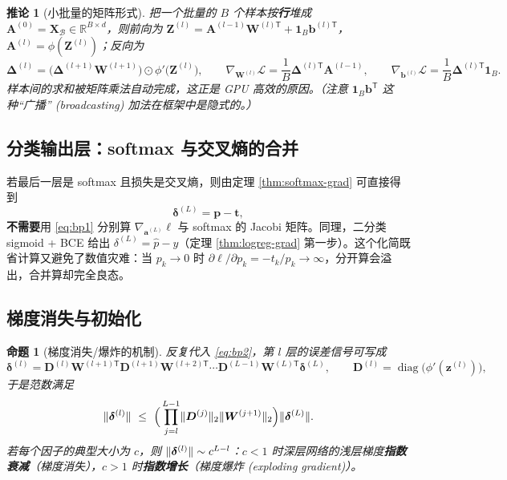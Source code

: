 \documentclass[UTF8,a4paper,11pt]{ctexart}
\theoremstyle{definition}
\theoremstyle{plain}
\newtheorem{proposition}[definition]{命题}
\newtheorem{corollary}[definition]{推论}
\theoremstyle{remark}
\DeclarePairedDelimiter{\norm}{\lVert}{\rVert}
\DeclareMathOperator{\diag}{diag}
\newcommand{\R}{\mathbb{R}}
\newcommand{\Loss}{\mathcal{L}}
\newcommand{\T}{^{\mathsf{T}}}
\newcommand{\eng}[1]{\textup{(#1)}}
\begin{document}
\begin{corollary}[小批量的矩阵形式]\label{cor:bp-batch}
把一个批量的 $B$ 个样本按\textbf{行}堆成 $\bm{A}^{(0)}=\bm{X}_{\mathcal{B}}\in\R^{B\times d}$，则前向为
$\bm{Z}^{(l)}=\bm{A}^{(l-1)}\bm{W}^{(l)\mathsf{T}}+\bm{1}_B\bm{b}^{(l)\mathsf{T}}$，$\bm{A}^{(l)}=\phi(\bm{Z}^{(l)})$；反向为
\[
  \bm{\Delta}^{(l)}=\big(\bm{\Delta}^{(l+1)}\bm{W}^{(l+1)}\big)\odot\phi'\big(\bm{Z}^{(l)}\big),
  \qquad
  \nabla_{\bm{W}^{(l)}}\Loss=\frac1B\bm{\Delta}^{(l)\mathsf{T}}\bm{A}^{(l-1)},
  \qquad
  \nabla_{\bm{b}^{(l)}}\Loss=\frac1B\bm{\Delta}^{(l)\mathsf{T}}\bm{1}_B .
\]
样本间的求和被矩阵乘法自动完成，这正是 GPU 高效的原因。（注意 $\bm{1}_B\bm{b}\T$ 这种“广播” \eng{broadcasting} 加法在框架中是隐式的。）
\end{corollary}

\subsection{分类输出层：softmax 与交叉熵的合并}

若最后一层是 softmax 且损失是交叉熵，则由定理 \ref{thm:softmax-grad} 可直接得到
\begin{equation}\label{eq:bp-softmax}
  \bm{\delta}^{(L)}=\bm{p}-\bm{t},
\end{equation}
\textbf{不需要}用 \eqref{eq:bp1} 分别算 $\nabla_{\bm{a}^{(L)}}\ell$ 与 softmax 的 Jacobi 矩阵。同理，二分类 sigmoid + BCE 给出 $\delta^{(L)}=\hat p-y$（定理 \ref{thm:logreg-grad} 第一步）。这个化简既省计算又避免了数值灾难：当 $p_k\to0$ 时 $\partial\ell/\partial p_k=-t_k/p_k\to\infty$，分开算会溢出，合并算却完全良态。

\subsection{梯度消失与初始化}

\begin{proposition}[梯度消失/爆炸的机制]\label{prop:vanish}
反复代入 \eqref{eq:bp2}，第 $l$ 层的误差信号可写成
\[
  \bm{\delta}^{(l)}=\bm{D}^{(l)}\bm{W}^{(l+1)\mathsf{T}}\bm{D}^{(l+1)}\bm{W}^{(l+2)\mathsf{T}}\cdots\bm{D}^{(L-1)}\bm{W}^{(L)\mathsf{T}}\bm{\delta}^{(L)},
  \qquad \bm{D}^{(l)}=\diag\big(\phi'(\bm{z}^{(l)})\big),
\]
于是范数满足
\[
  \norm{\bm{\delta}^{(l)}}\ \le\ \Big(\prod_{j=l}^{L-1}\norm{\bm{D}^{(j)}}_2\norm{\bm{W}^{(j+1)}}_2\Big)\norm{\bm{\delta}^{(L)}} .
\]
若每个因子的典型大小为 $c$，则 $\norm{\bm{\delta}^{(l)}}\sim c^{L-l}$：$c<1$ 时深层网络的浅层梯度\textbf{指数衰减}（梯度消失），$c>1$ 时\textbf{指数增长}（梯度爆炸 \eng{exploding gradient}）。
\end{proposition}
\end{document}
